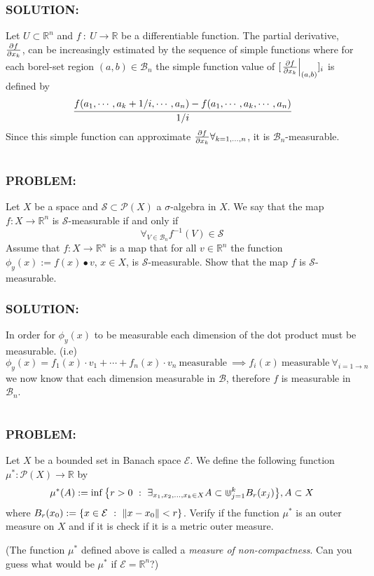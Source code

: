 \documentclass[]{article}
\newcommand{\Problem}{\subsubsection*{\textbf{PROBLEM:}}}
\newcommand{\Solution}{\subsubsection*{\textbf{SOLUTION:}}}
\newcommand{\Preliminaries}{\subsubsection*{\textbf{PRELIMINARIES:}}}
\newcommand{\R}{\mathbb{R}}
\newcommand{\SigAlg}{\mathcal{S}}
\newcommand{\st}{\ : \ }
\begin{document}
\Solution
Let $U \subset \R^n$ and $f \st U \to \R$ be a differentiable function.
The partial derivative, $\pdv{f}{x_k}$, can be increasingly estimated by the sequence of simple functions where for each borel-set region $(a,b) \in \mathcal{B}_n$ the simple function value of $[\eval{\pdv{f}{x_k}}_{(a,b)}]_i$ is defined by \[
    \cfrac{
        f\qty(
            a_1, \cdots, a_k + 1/i, \cdots, a_n
        ) - f \qty(
            a_1, \cdots, a_k, \cdots, a_n
        )
        }{
            1/i
        }
\] Since this simple function can approximate $\pdv{f}{x_k} \forall_{k = 1,\dots,n}$, it is $\mathcal{B}_n$-measurable.

\newpage
\section{}
\Problem
Let $X$ be a space and $\SigAlg \subset \mathcal{P}(X)$ a $\sigma$-algebra in $X$. 
We say that the map $f : X \to \R^n$ is $\SigAlg$-measurable if and only if \[
    \forall_{V \in \mathcal{B}_n} f^{-1}(V) \in \SigAlg
\] Assume that $f : X \to \R^n$ is a map that for all $v \in \R^n$ the function $\phi_y(x):= f(x) \bullet v$, $x \in X$, is $\SigAlg$-measurable.
Show that the map $f$ is $\SigAlg$-measurable.


\Solution
In order for $\phi_y(x)$ to be measurable each dimension of the dot product must be measurable. (i.e)\[
    \phi_y(x) = f_1(x) \cdot v_1 + \cdots + f_n(x) \cdot v_n \ \text{measurable} \ \implies f_i(x) \ \text{measurable} \ \forall_{i = 1\to n}
\] we now know that each dimension measurable in $\mathcal{B}$, therefore $f$ is measurable in $\mathcal{B}_n$.

\newpage
\section{}
\Problem
Let $X$ be a bounded set in Banach space $\mathcal{E}$. 
We define the following function $\mu^* : \mathcal{P}(X) \to \R$ by \[
    \mu^* (A) := \inf\qty{
        r > 0 \st \exists_{x_1,x_2,\dots,x_k \in X} A \subset \Cup_{j=1}^{k} B_r(x_j)
    }, A \subset X
\] where $B_r(x_0):= \{x \in \mathcal{E} \st \norm{x - x_0} < r\}$. 
Verify if the function $\mu^*$ is an outer measure on $X$ and if it is check if it is a metric outer measure.

(The function $\mu^*$ defined above is called a \emph{measure of non-compactness}. 
Can you guess what would be $\mu^*$ if $\mathcal{E} = \R^n$?)
\end{document}
